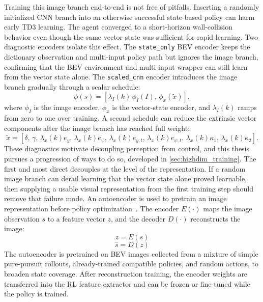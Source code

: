 Training this image branch end-to-end is not free of pitfalls. Inserting a randomly initialized CNN branch into an otherwise successful state-based policy can harm early TD3 learning. The agent converged to a short-horizon wall-collision behavior even though the same vector state was sufficient for rapid learning. Two diagnostic encoders isolate this effect. The \texttt{state\_only} BEV encoder keeps the dictionary observation and multi-input policy path but ignores the image branch, confirming that the BEV environment and multi-input wrapper can still learn from the vector state alone. The \texttt{scaled\_cnn} encoder introduces the image branch gradually through a scalar schedule:
\begin{equation}
    \phi(s) =
    \left[
    \lambda_I(k)\,\phi_I(I),\,
    \phi_x(\tilde{x})
    \right],
    \label{eq:scaled_cnn_features}
\end{equation}
where $\phi_I$ is the image encoder, $\phi_x$ is the vector-state encoder, and $\lambda_I(k)$ ramps from zero to one over training. A second schedule can reduce the extrinsic vector components after the image branch has reached full weight:
\begin{equation}
    \tilde{x} =
    [\delta,\,
    \gamma,\,
    \lambda_x(k)e_y,\,
    \lambda_x(k)e_\psi,\,
    \lambda_x(k)e_{y,t},\,
    \lambda_x(k)e_{\psi,t},\,
    \lambda_x(k)\kappa_1,\,
    \lambda_x(k)\kappa_2].
    \label{eq:state_scale_features}
\end{equation}
These diagnostics motivate decoupling perception from control, and this thesis pursues a progression of ways to do so, developed in \cref{sec:highdim_training}. The first and most direct decouples at the level of the representation. If a random image branch can derail learning that the vector state alone proved learnable, then supplying a usable visual representation from the first training step should remove that failure mode. An autoencoder is used to pretrain an image representation before policy optimization~\cite{lange2010deep}. The encoder $E(\cdot)$ maps the image observation $s$ to a feature vector $z$, and the decoder $D(\cdot)$ reconstructs the image:
\begin{equation}
    z = E(s)
    \label{eq:encoder}
\end{equation}
\begin{equation}
    \hat{s} = D(z)
    \label{eq:decoder}
\end{equation}
The autoencoder is pretrained on BEV images collected from a mixture of simple pure-pursuit rollouts, already-trained compatible policies, and random actions, to broaden state coverage. After reconstruction training, the encoder weights are transferred into the RL feature extractor and can be frozen or fine-tuned while the policy is trained.

